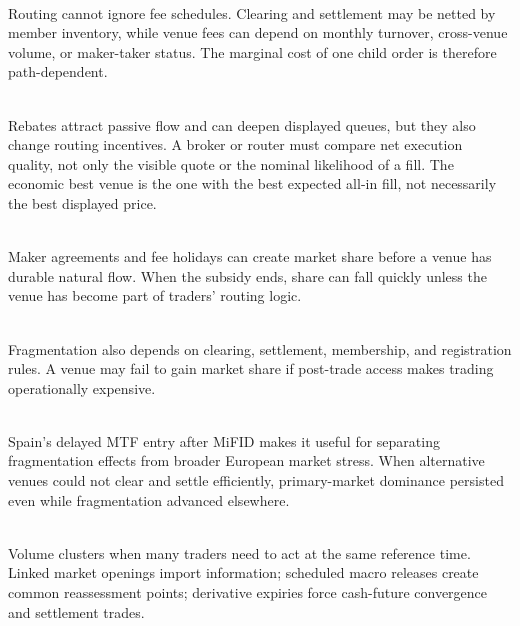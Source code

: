 \documentclass[a4paper,oneside,openany]{book}
\begin{document}
\begin{caveat} \\
Routing cannot ignore fee schedules. Clearing and settlement may be netted by member inventory, while venue fees can depend on monthly turnover, cross-venue volume, or maker-taker status. The marginal cost of one child order is therefore path-dependent.
\end{caveat}

\begin{mechanism} \\
Rebates attract passive flow and can deepen displayed queues, but they also change routing incentives. A broker or router must compare net execution quality, not only the visible quote or the nominal likelihood of a fill. The economic best venue is the one with the best expected all-in fill, not necessarily the best displayed price.
\end{mechanism}

\begin{caveat} \\
Maker agreements and fee holidays can create market share before a venue has durable natural flow. When the subsidy ends, share can fall quickly unless the venue has become part of traders' routing logic.
\end{caveat}

\begin{caveat} \\
Fragmentation also depends on clearing, settlement, membership, and registration rules. A venue may fail to gain market share if post-trade access makes trading operationally expensive.
\end{caveat}

\begin{casestudy} \\
Spain's delayed MTF entry after MiFID makes it useful for separating fragmentation effects from broader European market stress. When alternative venues could not clear and settle efficiently, primary-market dominance persisted even while fragmentation advanced elsewhere.
\end{casestudy}

\begin{mechanism} \\
Volume clusters when many traders need to act at the same reference time.\\
Linked market openings import information; scheduled macro releases create common reassessment points; derivative expiries force cash-future convergence and settlement trades.
\end{mechanism}
\end{document}
